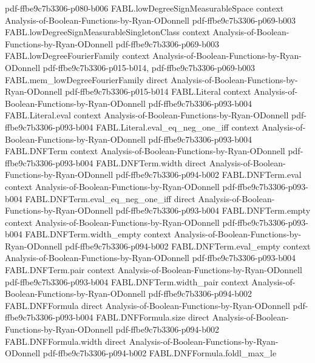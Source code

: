 \begin{theorem}
{    pdf-ffbe9c7b3306-p080-b006}
\proofstep
  {FABL.lowDegreeSignMeasurableSpace}
  {context}
  {Analysis-of-Boolean-Functions-by-Ryan-ODonnell}
  {pdf-ffbe9c7b3306-p069-b003}
\proofstep
  {FABL.lowDegreeSignMeasurableSingletonClass}
  {context}
  {Analysis-of-Boolean-Functions-by-Ryan-ODonnell}
  {pdf-ffbe9c7b3306-p069-b003}
\proofstep
  {FABL.lowDegreeFourierFamily}
  {context}
  {Analysis-of-Boolean-Functions-by-Ryan-ODonnell}
  {pdf-ffbe9c7b3306-p015-b014,
    pdf-ffbe9c7b3306-p069-b003}
\proofstep
  {FABL.mem_lowDegreeFourierFamily}
  {direct}
  {Analysis-of-Boolean-Functions-by-Ryan-ODonnell}
  {pdf-ffbe9c7b3306-p015-b014}
\proofstep
  {FABL.Literal}
  {context}
  {Analysis-of-Boolean-Functions-by-Ryan-ODonnell}
  {pdf-ffbe9c7b3306-p093-b004}
\proofstep
  {FABL.Literal.eval}
  {context}
  {Analysis-of-Boolean-Functions-by-Ryan-ODonnell}
  {pdf-ffbe9c7b3306-p093-b004}
\proofstep
  {FABL.Literal.eval_eq_neg_one_iff}
  {context}
  {Analysis-of-Boolean-Functions-by-Ryan-ODonnell}
  {pdf-ffbe9c7b3306-p093-b004}
\proofstep
  {FABL.DNFTerm}
  {context}
  {Analysis-of-Boolean-Functions-by-Ryan-ODonnell}
  {pdf-ffbe9c7b3306-p093-b004}
\proofstep
  {FABL.DNFTerm.width}
  {direct}
  {Analysis-of-Boolean-Functions-by-Ryan-ODonnell}
  {pdf-ffbe9c7b3306-p094-b002}
\proofstep
  {FABL.DNFTerm.eval}
  {context}
  {Analysis-of-Boolean-Functions-by-Ryan-ODonnell}
  {pdf-ffbe9c7b3306-p093-b004}
\proofstep
  {FABL.DNFTerm.eval_eq_neg_one_iff}
  {direct}
  {Analysis-of-Boolean-Functions-by-Ryan-ODonnell}
  {pdf-ffbe9c7b3306-p093-b004}
\proofstep
  {FABL.DNFTerm.empty}
  {context}
  {Analysis-of-Boolean-Functions-by-Ryan-ODonnell}
  {pdf-ffbe9c7b3306-p093-b004}
\proofstep
  {FABL.DNFTerm.width_empty}
  {context}
  {Analysis-of-Boolean-Functions-by-Ryan-ODonnell}
  {pdf-ffbe9c7b3306-p094-b002}
\proofstep
  {FABL.DNFTerm.eval_empty}
  {context}
  {Analysis-of-Boolean-Functions-by-Ryan-ODonnell}
  {pdf-ffbe9c7b3306-p093-b004}
\proofstep
  {FABL.DNFTerm.pair}
  {context}
  {Analysis-of-Boolean-Functions-by-Ryan-ODonnell}
  {pdf-ffbe9c7b3306-p093-b004}
\proofstep
  {FABL.DNFTerm.width_pair}
  {context}
  {Analysis-of-Boolean-Functions-by-Ryan-ODonnell}
  {pdf-ffbe9c7b3306-p094-b002}
\proofstep
  {FABL.DNFFormula}
  {direct}
  {Analysis-of-Boolean-Functions-by-Ryan-ODonnell}
  {pdf-ffbe9c7b3306-p093-b004}
\proofstep
  {FABL.DNFFormula.size}
  {direct}
  {Analysis-of-Boolean-Functions-by-Ryan-ODonnell}
  {pdf-ffbe9c7b3306-p094-b002}
\proofstep
  {FABL.DNFFormula.width}
  {direct}
  {Analysis-of-Boolean-Functions-by-Ryan-ODonnell}
  {pdf-ffbe9c7b3306-p094-b002}
\proofstep
  {FABL.DNFFormula.foldl_max_le}

\end{theorem}
